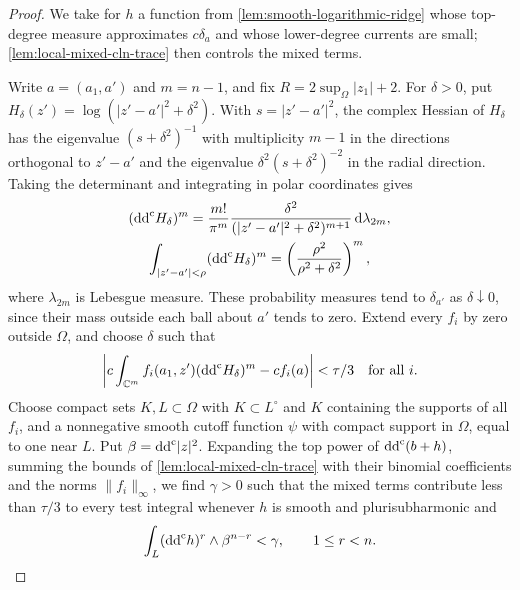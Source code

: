 \begin{proof}
We take for $h$ a function from \cref{lem:smooth-logarithmic-ridge} whose top-degree measure approximates $c\delta_a$ and whose lower-degree currents are small; \cref{lem:local-mixed-cln-trace} then controls the mixed terms.

Write $a=(a_1,a')$ and $m=n-1$, and fix $R=2\sup_\Omega|z_1|+2$. For $\delta>0$, put $H_\delta(z')=\log(|z'-a'|^2+\delta^2)$. With $s=|z'-a'|^2$, the complex Hessian of $H_\delta$ has the eigenvalue $(s+\delta^2)^{-1}$ with multiplicity $m-1$ in the directions orthogonal to $z'-a'$ and the eigenvalue $\delta^2(s+\delta^2)^{-2}$ in the radial direction. Taking the determinant and integrating in polar coordinates gives
\[
 \begin{gathered}
 (\mathrm{dd}^{\mathrm{c}} H_\delta)^m=
 \frac{m!}{\pi^m}\frac{\delta^2}{(|z'-a'|^2+\delta^2)^{m+1}}
                       \,\mathrm d\lambda_{2m},\\
 \int_{|z'-a'|<\rho}(\mathrm{dd}^{\mathrm{c}} H_\delta)^m
       =\left(\frac{\rho^2}{\rho^2+\delta^2}\right)^m,
 \end{gathered}
\]
where $\lambda_{2m}$ is Lebesgue measure. These probability measures tend to $\delta_{a'}$ as $\delta\downarrow0$, since their mass outside each ball about $a'$ tends to zero. Extend every $f_i$ by zero outside $\Omega$, and choose $\delta$ such that
\[
 \left|c\int_{\mathbb C^m}f_i(a_1,z')(\mathrm{dd}^{\mathrm{c}} H_\delta)^m
                  -cf_i(a)\right|<\tau/3\quad\text{for all }i.
\]
Choose compact sets $K,L\subset\Omega$ with $K\subset L^\circ$ and $K$ containing the supports of all $f_i$, and a nonnegative smooth cutoff function $\psi$ with compact support in $\Omega$, equal to one near $L$. Put $\beta=\mathrm{dd}^{\mathrm{c}}|z|^2$. Expanding the top power of $\mathrm{dd}^{\mathrm{c}}(b+h)$, summing the bounds of \cref{lem:local-mixed-cln-trace} with their binomial coefficients and the norms $\|f_i\|_\infty$, we find $\gamma>0$ such that the mixed terms contribute less than $\tau/3$ to every test integral whenever $h$ is smooth and plurisubharmonic and
\[
 \int_L(\mathrm{dd}^{\mathrm{c}} h)^r\wedge\beta^{n-r}<\gamma,
 \qquad 1\leq r<n.
\]


\end{proof}
